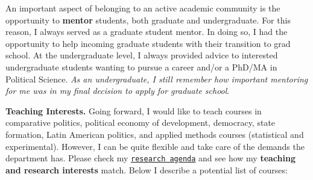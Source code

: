 An important aspect of belonging to an active academic community is the opportunity to {\bf mentor} students, both graduate and undergraduate. For this reason, I always served as a graduate student mentor. In doing so, I had the opportunity to help incoming graduate students with their transition to grad school. At the undergraduate level, I always provided advice to interested undergraduate students wanting to pursue a career and/or a PhD/MA in Political Science. \emph{As an undergraduate, I still remember how important mentoring for me was in my final decision to apply for graduate school}.

{\bf Teaching Interests.} Going forward, I would like to teach courses in comparative politics, political economy of development, democracy, state formation, Latin American politics, and applied methods courses (statistical and experimental). However, I can be quite flexible and take care of the demands the department has. Please check my \href{http://www.hectorbahamonde.com/research/}{\texttt{research agenda}} and see how my {\bf teaching and research interests} match. Below I describe a potential list of courses:

